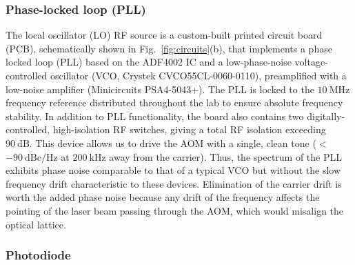 \documentclass[twocolumn,aip,rsi,reprint,bibnotes]{revtex4-1}
\newcommand\unit[2]{\ensuremath{#1~\mathrm{{#2}}}}
\begin{document}
\subsubsection{Phase-locked loop (PLL)}
The local oscillator (LO) RF source is a custom-built printed circuit board (PCB), schematically shown in Fig.~\ref{fig:circuits}(b), that implements a phase locked loop (PLL) based on the ADF4002 IC and a low-phase-noise voltage-controlled oscillator (VCO, Crystek CVCO55CL-0060-0110), preamplified with a low-noise amplifier (Minicircuits PSA4-5043+).
The PLL is locked to the \unit{10}{MHz} frequency reference distributed throughout the lab to ensure absolute frequency stability.
In addition to PLL functionality, the board also contains two digitally-controlled, high-isolation RF switches, giving a total RF isolation exceeding \unit{90}{dB}.
This device allows us to drive the AOM with a single, clean tone ($<$\unit{-90}{dBc/Hz} at \unit{200}{kHz} away from the carrier).
Thus, the spectrum of the PLL exhibits phase noise comparable to that of a typical VCO but without the slow frequency drift characteristic to these devices.
Elimination of the carrier drift is worth the added phase noise because any drift of the frequency affects the pointing of the laser beam passing through the AOM, which would misalign the optical lattice.


\subsubsection{Photodiode}
\end{document}
